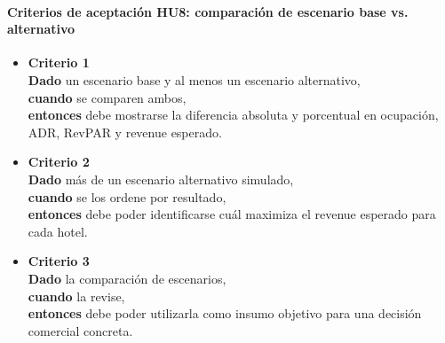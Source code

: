 \documentclass[
11pt, %
]{charter}
\begin{document}
\paragraph{Criterios de aceptación HU8: comparación de escenario base vs. alternativo}
\begin{itemize}
  \item \textbf{Criterio 1} \\
  \textbf{Dado} un escenario base y al menos un escenario alternativo, \\
  \textbf{cuando} se comparen ambos, \\
  \textbf{entonces} debe mostrarse la diferencia absoluta y porcentual en ocupación, ADR, RevPAR y revenue esperado.

  \item \textbf{Criterio 2} \\
  \textbf{Dado} más de un escenario alternativo simulado, \\
  \textbf{cuando} se los ordene por resultado, \\
  \textbf{entonces} debe poder identificarse cuál maximiza el revenue esperado para cada hotel.

  \item \textbf{Criterio 3} \\
  \textbf{Dado} la comparación de escenarios, \\
  \textbf{cuando} \clientename\hspace{1px} la revise, \\
  \textbf{entonces} debe poder utilizarla como insumo objetivo para una decisión comercial concreta.
\end{itemize}

\vspace{1em}
\end{document}
